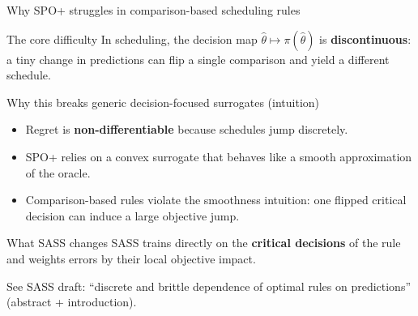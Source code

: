\documentclass[aspectratio=169,10pt]{beamer}
\newcommand{\btext}[1]{\textbf{\color{darkred}#1}}
\newcommand{\smallref}[1]{{\scriptsize\color{darkgray}#1}}
\begin{document}
\begin{frame}{Why SPO+ struggles in comparison-based scheduling rules}
  \begin{block}{The core difficulty}
    In scheduling, the decision map \(\hat{\theta}\mapsto \pi(\hat{\theta})\) is \btext{discontinuous}:
    a tiny change in predictions can flip a single comparison and yield a different schedule.
  \end{block}

  \begin{block}{Why this breaks generic decision-focused surrogates (intuition)}
    \begin{itemize}
      \item Regret is \btext{non-differentiable} because schedules jump discretely.
      \item SPO+ relies on a convex surrogate that behaves like a smooth approximation of the oracle.
      \item Comparison-based rules violate the smoothness intuition: one flipped critical decision can induce a large objective jump.
    \end{itemize}
  \end{block}

  \begin{block}{What SASS changes}
    SASS trains directly on the \btext{critical decisions} of the rule and weights errors by their local objective impact.
  \end{block}

  \smallref{See SASS draft: ``discrete and brittle dependence of optimal rules on predictions'' (abstract + introduction).}
\end{frame}
\end{document}
